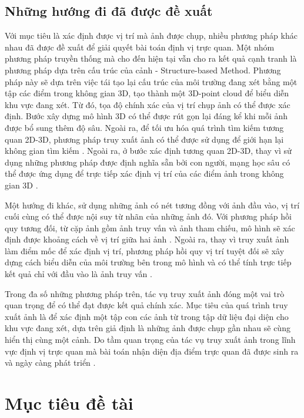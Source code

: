 \subsection{Những hướng đi đã được đề xuất}

Với mục tiêu là xác định được vị trí mà ảnh được chụp, nhiều phương pháp khác nhau đã được đề xuất để giải quyết bài toán định vị trực quan. Một nhóm phương pháp truyền thống mà cho đến hiện tại vẫn cho ra kết quả cạnh tranh là phương pháp dựa trên cấu trúc của cảnh - Structure-based Method. Phương pháp này sẽ dựa trên việc tái tạo lại cấu trúc của môi trường đang xét bằng một tập các điểm trong không gian 3D, tạo thành một 3D-point cloud để biểu diễn khu vực đang xét. Từ đó, tọa độ chính xác của vị trí chụp ảnh có thể được xác định. Bước xây dựng mô hình 3D có thể được rút gọn lại đáng kể khi mỗi ảnh được bổ sung thêm độ sâu. Ngoài ra, để tối ưu hóa quá trình tìm kiếm tương quan 2D-3D, phương pháp truy xuất ảnh có thể được sử dụng để giới hạn lại không gian tìm kiếm \cite{sarlin2019coarse}. Ngoài ra, ở bước xác định tương quan 2D-3D, thay vì sử dụng những phương pháp được định nghĩa sẵn bởi con người, mạng học sâu có thể được ứng dụng để trực tiếp xác định vị trí của các điểm ảnh trong không gian 3D \cite{brachmann2021visual}.

Một hướng đi khác, sử dụng những ảnh có nét tương đồng với ảnh đầu vào, vị trí cuối cùng có thể được nội suy từ nhãn của những ảnh đó. Với phương pháp hồi quy tương đối, từ cặp ảnh gồm ảnh truy vấn và ảnh tham chiếu, mô hình sẽ xác định được khoảng cách về vị trí giữa hai ảnh \cite{zhou2020learn}. Ngoài ra, thay vì truy xuất ảnh làm điểm mốc để xác định vị trí, phương pháp hồi quy vị trí tuyệt đối sẽ xây dựng cách biểu diễn của môi trường bên trong mô hình và có thể tính trực tiếp kết quả chỉ với đầu vào là ảnh truy vấn \cite{kendall2016posenet}.

Trong đa số những phương pháp trên, tác vụ truy xuất ảnh đóng một vai trò quan trọng để có thể đạt được kết quả chính xác. Mục tiêu của quá trình truy xuất ảnh là để xác định một tập con các ảnh từ trong tập dữ liệu đại diện cho khu vực đang xét, dựa trên giả định là những ảnh được chụp gần nhau sẽ cùng hiển thị cùng một cảnh. Do tầm quan trọng của tác vụ truy xuất ảnh trong lĩnh vực định vị trực quan mà bài toán nhận diện địa điểm trực quan đã được sinh ra và ngày càng phát triển \cite{berton2022rethinking}\cite{keetha2023anyloc}\cite{alibey2023mixvpr}.

\section{Mục tiêu đề tài}

